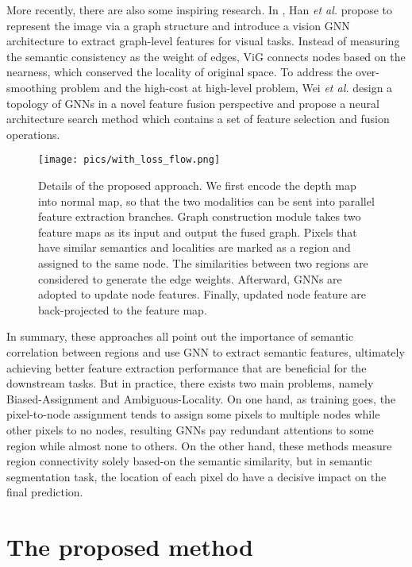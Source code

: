 ﻿\documentclass[journal]{IEEEtran}
\begin{document}
    
    More recently, there are also some inspiring research. In \cite{han2022VIG}, Han \emph{et al.} propose to represent the image via a graph structure and introduce a vision GNN architecture to extract graph-level features for visual tasks. Instead of measuring the semantic consistency as the weight of edges, ViG \cite{han2022VIG} connects nodes based on the nearness, which conserved the locality of original space. To address the over-smoothing problem and the high-cost at high-level problem, Wei \emph{et al.} \cite{2022TopoGNNFusion} design a topology of GNNs in a novel feature fusion perspective and propose a neural architecture search method which contains a set of feature selection and fusion operations.

    \begin{figure*}
        \centering
        \texttt{[image: pics/with\_loss\_flow.png]}
        \caption{Details of the proposed approach. We first encode the depth map into normal map, so that the two modalities can be sent into parallel feature extraction branches. Graph construction module takes two feature maps as its input and output the fused graph. Pixels that have similar semantics and localities are marked as a region and assigned to the same node. The similarities between two regions are considered to generate the edge weights. Afterward, GNNs are adopted to update node features. Finally, updated node feature are back-projected to the feature map. }
        \label{fig_overview}
    \end{figure*}
    
    In summary, these approaches all point out the importance of semantic correlation between regions and use GNN to extract semantic features, ultimately achieving better feature extraction performance that are beneficial for the downstream tasks. But in practice, there exists two main problems, namely Biased-Assignment and Ambiguous-Locality. On one hand, as training goes, the pixel-to-node assignment tends to assign some pixels to multiple nodes while other pixels to no nodes, resulting GNNs pay redundant attentions to some region while almost none to others. On the other hand, these methods measure region connectivity solely based-on the semantic similarity, but in semantic segmentation task, the location of each pixel do have a decisive impact on the final prediction.

\section{The proposed method}  \label{sec_method}
\end{document}
